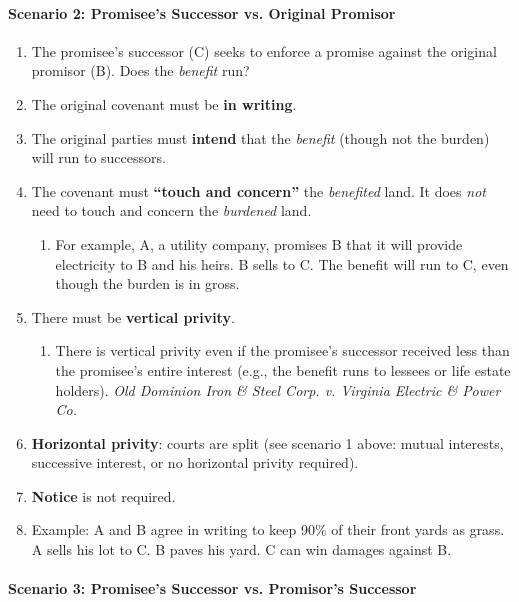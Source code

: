 \paragraph{Scenario 2: Promisee's Successor vs. Original Promisor}

\begin{enumerate}
    \item The promisee's successor (C) seeks to enforce a promise against the 
    original promisor (B). Does the \emph{benefit} run?
    \item The original covenant must be \textbf{in writing}.
    \item The original parties must \textbf{intend} that the \emph{benefit} 
    (though not the burden) will run to successors.
    \item The covenant must \textbf{``touch and concern''} the 
    \emph{benefited} land. It does \emph{not} need to touch and concern the 
    \emph{burdened} land.
    \begin{enumerate}
        \item For example, A, a utility company, promises B that it will 
        provide electricity to B and his heirs. B sells to C. The benefit will 
        run to C, even though the burden is in gross.
    \end{enumerate}
    \item There must be \textbf{vertical privity}.
    \begin{enumerate}
        \item There is vertical privity even if the promisee's successor 
        received less than the promisee's entire interest (e.g., the benefit 
        runs to lessees or life estate holders). \emph{Old Dominion Iron \& 
        Steel Corp. v. Virginia Electric \& Power Co.}
    \end{enumerate}
    \item \textbf{Horizontal privity}: courts are split (see scenario 1 above: 
    mutual interests, successive interest, or no horizontal privity required).
    \item \textbf{Notice} is not required.
    \item Example: A and B agree in writing to keep 90\% of their front yards 
    as grass. A sells his lot to C. B paves his yard. C can win damages 
    against B.
\end{enumerate}

\paragraph{Scenario 3: Promisee's Successor vs. Promisor's Successor}

